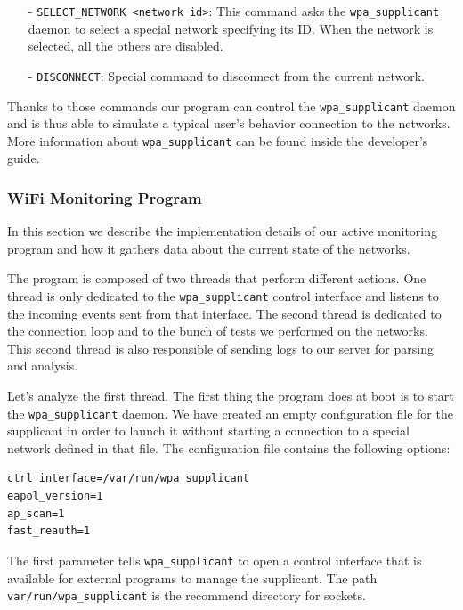 \begin{itemize}
	\item[-] \texttt{SELECT\_NETWORK <network id>}: This command asks the \texttt{wpa\_supplicant} daemon to select a special network specifying its ID. When the network is selected, all the others are disabled.

	\item[-] \texttt{DISCONNECT}: Special command to disconnect from the current network.
\end{itemize}

Thanks to those commands our program can control the \texttt{wpa\_supplicant} daemon and is thus able to simulate a typical user's behavior connection to the networks. More information about \texttt{wpa\_supplicant} can be found inside the developer's guide\cite{wpa-supplicant-devel}.


\subsubsection{WiFi Monitoring Program}
In this section we describe the implementation details of our active monitoring program and how it gathers data about the current state of the networks.

The program is composed of two threads that perform different actions. One thread is only dedicated to the \texttt{wpa\_supplicant} control interface and listens to the incoming events sent from that interface. The second thread is dedicated to the connection loop and to the bunch of tests we performed on the networks. This second thread is also responsible of sending logs to our server for parsing and analysis.

Let's analyze the first thread. The first thing the program does at boot is to start the \texttt{wpa\_supplicant} daemon. We have created an empty configuration file for the supplicant in order to launch it without starting a connection to a special network defined in that file. The configuration file contains the following options:\\

\begin{lstlisting}[frame=single,breaklines=true,caption={\texttt{wpa\_supplicant.conf}}]
ctrl_interface=/var/run/wpa_supplicant
eapol_version=1
ap_scan=1
fast_reauth=1
\end{lstlisting}
\par The first parameter tells \texttt{wpa\_supplicant} to open a control interface that is available for external programs to manage the supplicant. The path \texttt{var/run/wpa\_supplicant} is the recommend directory for sockets. 


